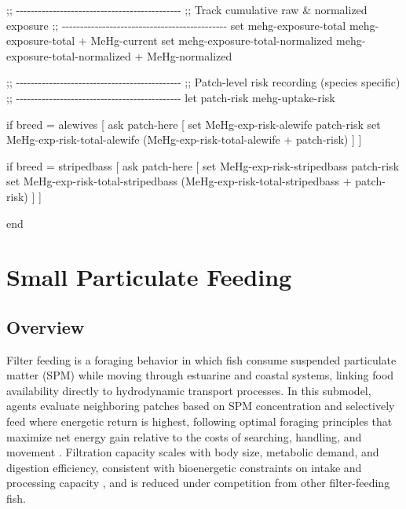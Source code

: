 \documentclass[
]{book}
\newenvironment{Shaded}{\begin{snugshade}}{\end{snugshade}}
\newcommand{\NormalTok}[1]{#1}
\begin{document}
\begin{Shaded}
\begin{Highlighting}[]
\NormalTok{  ;; {-}{-}{-}{-}{-}{-}{-}{-}{-}{-}{-}{-}{-}{-}{-}{-}{-}{-}{-}{-}{-}{-}{-}{-}{-}{-}{-}{-}{-}{-}{-}{-}{-}{-}{-}{-}{-}{-}{-}{-}{-}{-}{-}{-}{-}}
\NormalTok{  ;; Track cumulative raw \& normalized exposure}
\NormalTok{  ;; {-}{-}{-}{-}{-}{-}{-}{-}{-}{-}{-}{-}{-}{-}{-}{-}{-}{-}{-}{-}{-}{-}{-}{-}{-}{-}{-}{-}{-}{-}{-}{-}{-}{-}{-}{-}{-}{-}{-}{-}{-}{-}{-}{-}{-}}
\NormalTok{  set mehg{-}exposure{-}total            mehg{-}exposure{-}total + MeHg{-}current}
\NormalTok{  set mehg{-}exposure{-}total{-}normalized mehg{-}exposure{-}total{-}normalized + MeHg{-}normalized}
  
\NormalTok{  ;; {-}{-}{-}{-}{-}{-}{-}{-}{-}{-}{-}{-}{-}{-}{-}{-}{-}{-}{-}{-}{-}{-}{-}{-}{-}{-}{-}{-}{-}{-}{-}{-}{-}{-}{-}{-}{-}{-}{-}{-}{-}{-}{-}{-}{-}}
\NormalTok{  ;; Patch{-}level risk recording (species specific)}
\NormalTok{  ;; {-}{-}{-}{-}{-}{-}{-}{-}{-}{-}{-}{-}{-}{-}{-}{-}{-}{-}{-}{-}{-}{-}{-}{-}{-}{-}{-}{-}{-}{-}{-}{-}{-}{-}{-}{-}{-}{-}{-}{-}{-}{-}{-}{-}{-}}
\NormalTok{  let patch{-}risk mehg{-}uptake{-}risk}
  
\NormalTok{  if breed = alewives [}
\NormalTok{    ask patch{-}here [}
\NormalTok{      set MeHg{-}exp{-}risk{-}alewife       patch{-}risk}
\NormalTok{      set MeHg{-}exp{-}risk{-}total{-}alewife (MeHg{-}exp{-}risk{-}total{-}alewife + patch{-}risk)}
\NormalTok{    ]}
\NormalTok{  ]}
  
\NormalTok{  if breed = stripedbass [}
\NormalTok{    ask patch{-}here [}
\NormalTok{      set MeHg{-}exp{-}risk{-}stripedbass       patch{-}risk}
\NormalTok{      set MeHg{-}exp{-}risk{-}total{-}stripedbass (MeHg{-}exp{-}risk{-}total{-}stripedbass + patch{-}risk)}
\NormalTok{    ]}
\NormalTok{  ]}

\NormalTok{end}
\end{Highlighting}
\end{Shaded}

\chapter{Small Particulate Feeding}\label{small-particulate-feeding}

\section{Overview}\label{overview-5}

Filter feeding is a foraging behavior in which fish consume suspended particulate matter (SPM) while moving through estuarine and coastal systems, linking food availability directly to hydrodynamic transport processes. In this submodel, agents evaluate neighboring patches based on SPM concentration and selectively feed where energetic return is highest, following optimal foraging principles that maximize net energy gain relative to the costs of searching, handling, and movement \citep{townsend_application_1985}. Filtration capacity scales with body size, metabolic demand, and digestion efficiency, consistent with bioenergetic constraints on intake and processing capacity \citep{norin_metabolic_2018}, and is reduced under competition from other filter-feeding fish.
\end{document}
